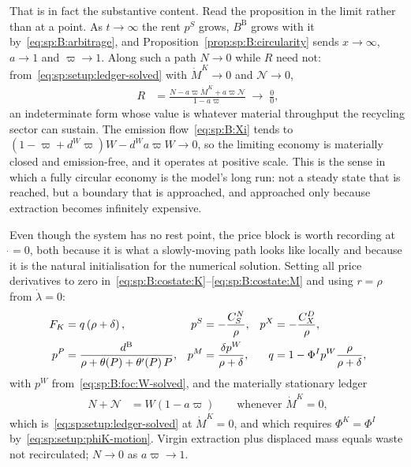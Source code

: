 That is in fact the substantive content. Read the proposition in the limit rather than at a point. As
$t\to\infty$ the rent $p^S$ grows, $B^{\mathrm B}$ grows with it by~\eqref{eq:sp:B:arbitrage}, and
Proposition~\ref{prop:sp:B:circularity} sends $x\to\infty$, $a\to1$ and $\varpi\to1$. Along such a path
$N\to0$ while $R$ need not: from~\eqref{eq:sp:setup:ledger-solved} with $\dot M^K\to0$ and
$\mathcal N\to0$,
\begin{align}
R &= \frac{N-a\varpi\dot M^K+a\varpi\mathcal N}{1-a\varpi}\;\longrightarrow\;\frac{0}{0},
\label{eq:sp:B:limit}
\end{align}
an indeterminate form whose value is whatever material throughput the recycling sector can sustain. The
emission flow~\eqref{eq:sp:B:Xi} tends to
$\left(1-\varpi+d^W\varpi\right)W-d^Wa\varpi W\to0$, so the limiting economy is materially closed and
emission-free, and it operates at positive scale. This is the sense in which a fully circular economy is
the model's long run: not a steady state that is reached, but a boundary that is approached, and
approached only because extraction becomes infinitely expensive.

 Even though the system has no rest point, the price block is
worth recording at $\dot{}=0$, both because it is what a slowly-moving path looks like locally and
because it is the natural initialisation for the numerical solution. Setting all price derivatives to
zero in~\eqref{eq:sp:B:costate:K}--\eqref{eq:sp:B:costate:M} and using $r=\rho$ from $\dot\lambda=0$:
\begin{align}
F_K &= q\left(\rho+\delta\right),
&
p^S &= -\frac{C^N_S}{\rho},
&
p^X &= -\frac{C^D_X}{\rho},
\notag\\
p^P &= \frac{d^{\mathrm B}}{\rho+\theta\!\left(P\right)+\theta'\!\left(P\right)P},
&
p^M &= \frac{\delta p^W}{\rho+\delta},
&
q &= 1-\Phi^Ip^W\frac{\rho}{\rho+\delta},
\label{eq:sp:B:quasistationary}
\end{align}
with $p^W$ from~\eqref{eq:sp:B:foc:W-solved}, and the materially stationary ledger
\begin{align}
N+\mathcal N &= W\left(1-a\varpi\right)
\qquad\text{whenever }\dot M^K=0,
\label{eq:sp:B:material-stationary}
\end{align}
which is~\eqref{eq:sp:setup:ledger-solved} at $\dot M^K=0$, and which requires $\Phi^K=\Phi^I$
by~\eqref{eq:sp:setup:phiK-motion}. Virgin extraction plus displaced mass equals waste not recirculated;
$N\to0$ as $a\varpi\to1$.

